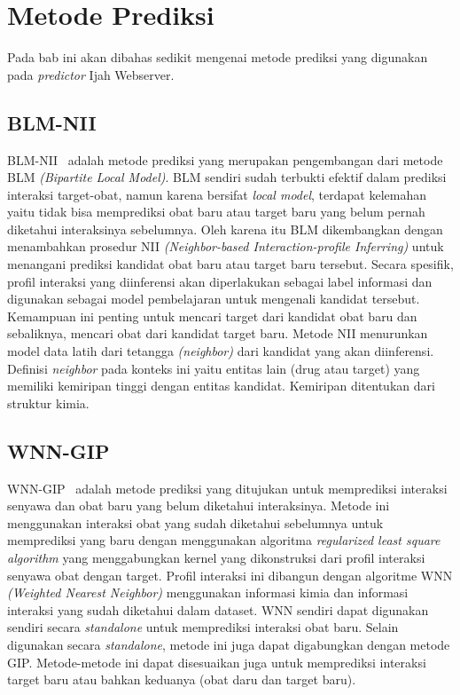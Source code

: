 \chapter{Metode Prediksi} \label{chap:prediksi}

Pada bab ini akan dibahas sedikit mengenai metode prediksi yang digunakan pada \emph{predictor} Ijah Webserver.

\section{BLM-NII}
BLM-NII~\cite{MeiKYLZ13} adalah metode prediksi yang merupakan pengembangan dari metode BLM \emph{(Bipartite Local Model)}. BLM sendiri sudah terbukti efektif dalam prediksi interaksi target-obat, namun karena bersifat \emph{local model}, terdapat kelemahan yaitu tidak bisa memprediksi obat baru atau target baru yang belum pernah diketahui interaksinya sebelumnya. Oleh karena itu BLM dikembangkan dengan menambahkan prosedur NII \emph{(Neighbor-based Interaction-profile Inferring)} untuk menangani prediksi kandidat obat baru atau target baru tersebut. Secara spesifik, profil interaksi yang diinferensi akan diperlakukan sebagai label informasi dan digunakan sebagai model pembelajaran untuk mengenali kandidat tersebut. Kemampuan ini penting untuk mencari target dari kandidat obat baru dan sebaliknya, mencari obat dari kandidat target baru. Metode NII menurunkan model data latih dari tetangga \emph{(neighbor)} dari kandidat yang akan diinferensi. Definisi \emph{neighbor} pada konteks ini yaitu entitas lain (drug atau target) yang memiliki kemiripan tinggi dengan entitas kandidat. Kemiripan ditentukan dari struktur kimia.

\section{WNN-GIP}
WNN-GIP~\cite{pmid23840562} adalah metode prediksi yang ditujukan untuk memprediksi interaksi senyawa dan obat baru yang belum diketahui interaksinya. Metode ini menggunakan interaksi obat yang sudah diketahui sebelumnya untuk memprediksi yang baru dengan menggunakan algoritma \emph{regularized least square algorithm} yang menggabungkan kernel yang dikonstruksi dari profil interaksi senyawa obat dengan target. Profil interaksi ini dibangun dengan algoritme WNN \emph{(Weighted Nearest Neighbor)} menggunakan informasi kimia dan informasi interaksi yang sudah diketahui dalam dataset. WNN sendiri dapat digunakan sendiri secara \emph{standalone} untuk memprediksi interaksi obat baru. Selain digunakan secara \emph{standalone}, metode ini juga dapat digabungkan dengan metode GIP. Metode-metode ini dapat disesuaikan juga untuk memprediksi interaksi target baru atau bahkan keduanya (obat daru dan target baru).